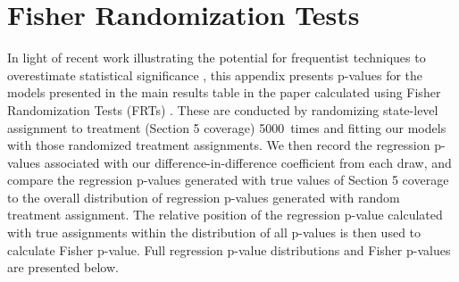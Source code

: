 \documentclass[12pt]{article}
\begin{document}

\section{Fisher Randomization Tests}\label{appendix_fisher}
\setcounter{table}{0}
\setcounter{figure}{0}
\renewcommand{\thetable}{J\arabic{table}}
\renewcommand{\thefigure}{J\arabic{figure}}
\normalsize

\newcommand{\fisherN}{5000}

In light of recent work illustrating the potential for frequentist techniques to overestimate statistical significance , this appendix presents p-values for the models presented in the main results table in the paper calculated using Fisher Randomization Tests (FRTs) .  These are conducted by randomizing state-level assignment to treatment (Section 5 coverage) \fisherN\ times and fitting our models with those randomized treatment assignments. We then record the regression p-values associated with our difference-in-difference coefficient from each draw, and compare the regression p-values generated with true values of Section 5 coverage to the overall distribution of regression p-values generated with random treatment assignment. The relative position of the regression p-value calculated with true assignments within the distribution of all p-values is then used to calculate Fisher p-value. Full regression p-value distributions and Fisher p-values are presented below.
\end{document}
